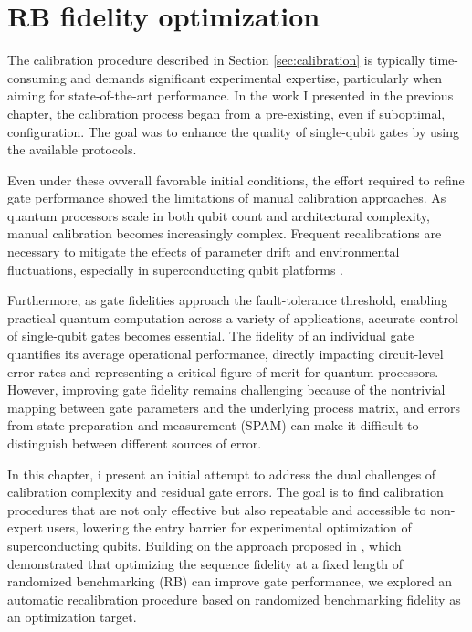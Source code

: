 \chapter{RB fidelity optimization}
The calibration procedure described in Section \ref{sec:calibration} is typically time-consuming and demands significant experimental expertise, particularly when aiming for state-of-the-art performance. 
In the work I presented in the previous chapter, the calibration process began from a pre-existing, even if suboptimal, configuration. 
The goal was to enhance the quality of single-qubit gates by using the available \Qibocal protocols.

Even under these ovverall favorable initial conditions, the effort required to refine gate performance showed the limitations of manual calibration approaches. 
As quantum processors scale in both qubit count and architectural complexity, manual calibration becomes increasingly complex. 
Frequent recalibrations are necessary to mitigate the effects of parameter drift and environmental fluctuations, especially in superconducting qubit platforms \cite{krantz_quantum_2019}.

Furthermore, as gate fidelities approach the fault-tolerance threshold, enabling practical quantum computation across a variety of applications, accurate control of single-qubit gates becomes essential. 
The fidelity of an individual gate quantifies its average operational performance, directly impacting circuit-level error rates and representing a critical figure of merit for quantum processors. 
However, improving gate fidelity remains challenging because of the nontrivial mapping between gate parameters and the underlying process matrix, and errors from state preparation and measurement (SPAM) can make it difficult to distinguish between different sources of error.

In this chapter, i present an initial attempt to address the dual challenges of calibration complexity and residual gate errors. 
The goal is to find calibration procedures that are not only effective but also repeatable and accessible to non-expert users, lowering the entry barrier for experimental optimization of superconducting qubits. 
Building on the approach proposed in \cite{kelly_optimal_2014}, which demonstrated that optimizing the sequence fidelity at a fixed length of randomized benchmarking (RB) can improve gate performance, we explored an automatic recalibration procedure based on randomized benchmarking fidelity as an optimization target.

